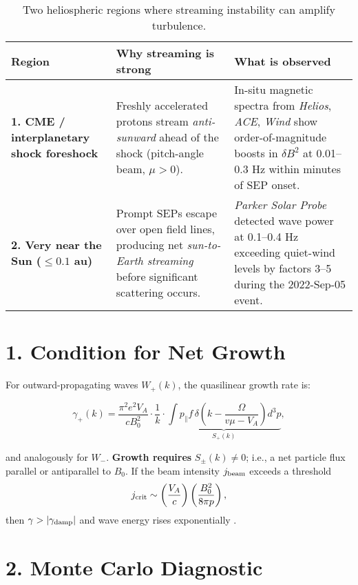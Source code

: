 \begin{table}[H]
\centering
\renewcommand{\arraystretch}{1.4}
\begin{tabular}{|p{4cm}|p{5.2cm}|p{5.2cm}|}
\hline
\textbf{Region} & \textbf{Why streaming is strong} & \textbf{What is observed} \\
\hline
\textbf{1. CME / interplanetary shock foreshock} & Freshly accelerated protons stream \textit{anti-sunward} ahead of the shock (pitch-angle beam, $\mu > 0$). & In-situ magnetic spectra from \textit{Helios}, \textit{ACE}, \textit{Wind} show order-of-magnitude boosts in $\delta B^2$ at 0.01–0.3 Hz within minutes of SEP onset. \\
\hline
\textbf{2. Very near the Sun ($\leq 0.1$ au)} & Prompt SEPs escape over open field lines, producing net \textit{sun-to-Earth streaming} before significant scattering occurs. & \textit{Parker Solar Probe} detected wave power at 0.1–0.4 Hz exceeding quiet-wind levels by factors 3–5 during the 2022-Sep-05 event. \\
\hline
\end{tabular}
\caption{Two heliospheric regions where streaming instability can amplify turbulence.}
\end{table}

\section*{1. Condition for Net Growth}

For outward-propagating waves $W_+(k)$, the quasilinear growth rate is:

\begin{equation}
\gamma_+(k) =
\frac{\pi^2 e^2 V_A}{c B_0^2} \cdot \frac{1}{k} \cdot
\underbrace{
\int p_\parallel f \, \delta\left(k - \frac{\Omega}{v\mu - V_A}\right) d^3p
}_{S_+(k)},
\end{equation}

and analogously for $W_-$.  
\textbf{Growth requires} $S_\pm(k) \neq 0$; i.e., a net particle flux parallel or antiparallel to $B_0$.  
If the beam intensity $j_{\rm beam}$ exceeds a threshold 
\[
j_{\rm crit} \sim \left( \frac{V_A}{c} \right) \left( \frac{B_0^2}{8\pi p} \right),
\]
then $\gamma > |\gamma_{\rm damp}|$ and wave energy rises exponentially \cite{Kulsrud1969,Lee2005}.

\section*{2. Monte Carlo Diagnostic}

